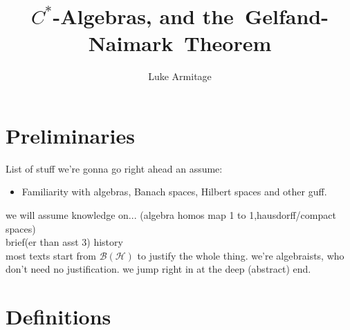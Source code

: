 \documentclass[12pt,a4paper]{amsart}
\author{Luke Armitage}
\title{$C^\ast$-Algebras, and the~Gelfand-Naimark~Theorem}
\theoremstyle{plain}
\theoremstyle{definition}
\renewcommand{\H}{\mathcal{H}}
\newcommand{\B}{\mathcal{B}}
\newcommand{\BH}{\mathcal{\B(\H)}}
\newcommand{\1}{\mathbbm{1}}
\begin{document}
\maketitle
\makeatletter  %
    \providecommand\@dotsep{5}
  \makeatother
\listoftodos\relax
\newcommand\Item[1][]{ %
  \ifx\relax#1\relax  \item \else \item[#1] \fi
  \abovedisplayskip=0pt\abovedisplayshortskip=0pt~\vspace*{-\baselineskip}}

\section{Preliminaries}


List of stuff we're gonna go right ahead an assume:
\begin{itemize}
\item	Familiarity with algebras, Banach spaces, Hilbert spaces and other guff.
\end{itemize}


we will assume knowledge on... (algebra homos map 1 to 1,hausdorff/compact spaces)\\
brief(er than asst 3) history \\
most texts start from $\BH$ to justify the whole thing. we're algebraists, who don't need no justification. we jump right in at the deep (abstract) end.


\section{Definitions}
\end{document}
